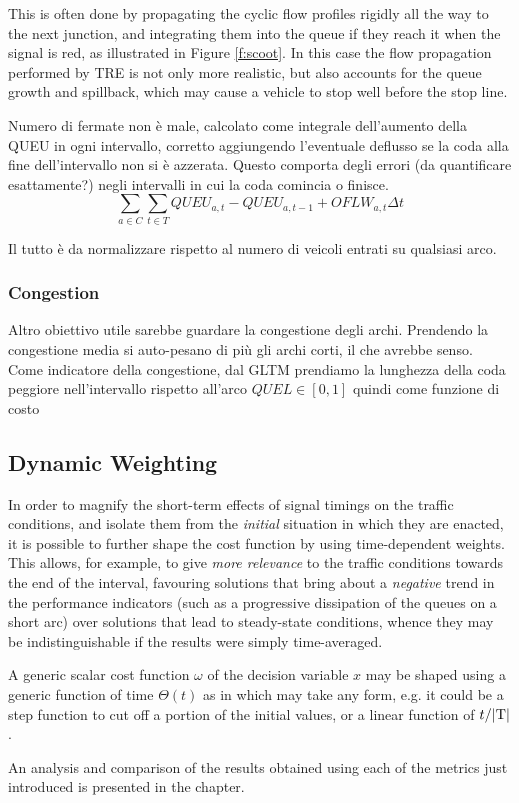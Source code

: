 This is often done by propagating the cyclic flow profiles rigidly all the way to the next junction, and integrating them into the queue if they reach it when the signal is red, as illustrated in Figure \ref{f:scoot}. In this case the flow propagation performed by TRE is not only more realistic, but also accounts for the queue growth and spillback, which may cause a vehicle to stop well before the stop line.

Numero di fermate non è male, calcolato come integrale dell'aumento della QUEU in ogni intervallo, corretto aggiungendo l'eventuale deflusso se la coda alla fine dell'intervallo non si è azzerata.
Questo comporta degli errori (da quantificare esattamente?) negli intervalli in cui la coda comincia o finisce.
$$
\sum_{a \in C} \sum_{t \in T} QUEU_{a,t} - QUEU_{a,t-1} + OFLW_{a,t} \Delta t
$$

Il tutto è da normalizzare rispetto al numero di veicoli entrati su qualsiasi arco.


\subsubsection{Congestion}

Altro obiettivo utile sarebbe guardare la congestione degli archi.
Prendendo la congestione media si auto-pesano di più gli archi corti, il che avrebbe senso.
Come indicatore della congestione, dal GLTM prendiamo la lunghezza della coda peggiore nell'intervallo rispetto all'arco $QUEL\in[0,1]$ quindi come funzione di costo


\subsection{Dynamic Weighting}
In order to magnify the short-term effects of signal timings on the traffic conditions, and isolate them from the \emph{initial} situation in which they are enacted, it is possible to further shape the cost function by using time-dependent weights. This allows, for example, to give \emph{more relevance} to the traffic conditions towards the end of the interval, favouring solutions that bring about a \emph{negative} trend in the performance indicators (such as a progressive dissipation of the queues on a short arc) over solutions that lead to steady-state conditions, whence they may be indistinguishable if the results were simply time-averaged.

A generic scalar cost function $\omega$ of the decision variable $x$
may be shaped using a generic function of time $\Theta(t)$ as in
which may take any form, e.g. it could be a step function to cut off a portion of the initial values, or a linear function of ${t}/{|\mathrm{T}|}$.

An analysis and comparison of the results obtained using each of the metrics just introduced is presented in the  chapter.
